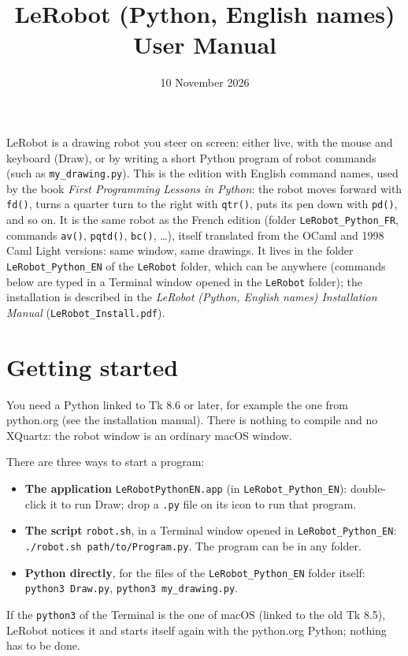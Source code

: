 \documentclass[11pt,a4paper]{article}
\title{LeRobot (Python, English names) User Manual}
\author{}
\date{10 November 2026}
\newcommand{\kbd}[1]{\texttt{#1}}
\begin{document}
\maketitle

LeRobot is a drawing robot you steer on screen: either live, with the mouse
and keyboard (Draw), or by writing a short Python program of robot commands
(such as \kbd{my\_drawing.py}). This is the edition with English command
names, used by the book \emph{First Programming Lessons in Python}: the
robot moves forward with \kbd{fd()}, turns a quarter turn to the right with
\kbd{qtr()}, puts its pen down with \kbd{pd()}, and so on. It is the same
robot as the French edition (folder \kbd{LeRobot\_Python\_FR}, commands
\kbd{av()}, \kbd{pqtd()}, \kbd{bc()}, \dots), itself translated from the
OCaml and 1998 Caml Light versions: same window, same drawings. It lives in
the folder \kbd{LeRobot\_Python\_EN} of the \kbd{LeRobot} folder, which can
be anywhere (commands below are typed in a Terminal window opened in the
\kbd{LeRobot} folder); the installation is described in the \emph{LeRobot
(Python, English names) Installation Manual} (\kbd{LeRobot\_Install.pdf}).

\tableofcontents

\section{Getting started}

You need a Python linked to Tk 8.6 or later, for example the one from
python.org (see the installation manual). There is nothing to compile and
no XQuartz: the robot window is an ordinary macOS window.

There are three ways to start a program:
\begin{itemize}
\item \textbf{The application} \kbd{LeRobotPythonEN.app} (in
  \kbd{LeRobot\_Python\_EN}): double-click it to run Draw; drop a \kbd{.py}
  file on its icon to run that program.
\item \textbf{The script} \kbd{robot.sh}, in a Terminal window opened in
  \kbd{LeRobot\_Python\_EN}: \kbd{./robot.sh path/to/Program.py}. The program
  can be in any folder.
\item \textbf{Python directly}, for the files of the \kbd{LeRobot\_Python\_EN}
  folder itself: \kbd{python3 Draw.py}, \kbd{python3 my\_drawing.py}.
\end{itemize}
If the \kbd{python3} of the Terminal is the one of macOS (linked to the old
Tk 8.5), LeRobot notices it and starts itself again with the python.org
Python; nothing has to be done.
\end{document}
